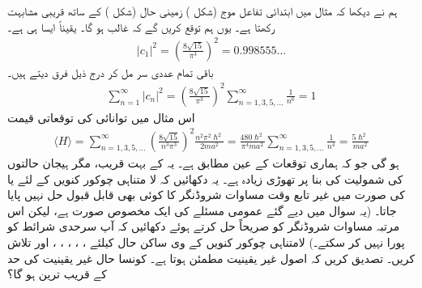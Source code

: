 ہم نے دیکھا کہ مثال  میں ابتدائی تفاعل موج (شکل ) زمینی حال  (شکل ) کے ساتھ قریبی مشابہت رکھتا ہے۔ یوں ہم توقع کریں گے کہ  غالب ہو گا۔ یقیناً ایسا ہی ہے۔
\begin{align*}
\left| c_{1} \right|^{2} = \left( \frac{8\sqrt{15}}{\pi^{3}} \right)^{2} = 0.998555 \dotso
\end{align*}
باقی تمام عددی سر مل کر درج ذیل فرق دیتے ہیں۔
\begin{align*}
\sum_{n=1}^{\infty} \left| c_{n} \right|^{2} = \left( \frac{8\sqrt{15}}{\pi^{3}} \right)^{2} \sum_{n=1,3,5,...}^{\infty} \frac{1}{n^{6}} = 1
\end{align*}
اس مثال میں توانائی کی توقعاتی قیمت
\begin{align*}
\langle H \rangle = \sum_{n=1,3,5,...}^{\infty} \left( \frac{8\sqrt{15}}{n^{3} \pi^{3}} \right)^{2} \frac{n^{2} \pi^{2} \hslash^{2}}{2ma^{2}} = \frac{480\hslash^{2}}{\pi^{4} ma^{2}} \sum_{n=1,3,5,...}^{\infty} \frac{1}{n^{4}} = \frac{5 \hslash^{2}}{ma^{2}}
\end{align*}
 ہو گی جو کہ ہماری توقعات کے عین مطابق ہے۔ یہ  کے بہت قریب، مگر ہیجان حالتوں کی شمولیت کی بنا پر تھوڑی زیادہ ہے۔ 
یہ دکھائیں کہ لا متناہی چوکور کنویں کے لئے  یا  کی صورت میں غیر تابع وقت مساوات شروڈنگر کا کوئی بھی قابل قبول حل نہیں پایا جاتا۔ (یہ سوال  میں دیے گئے عمومی مسئلے کی ایک مخصوص صورت ہے، لیکن اس مرتبہ مساوات شروڈنگر کو صریحاً حل کرتے ہوئے دکھائیں کہ آپ سرحدی شرائط کو پورا نہیں کر سکتے۔)
لامتناہی چوکور کنویں کے  وی ساکن حال کیلئے ، ، ، ، ، اور  تلاش کریں۔ تصدیق کریں کہ اصول غیر یقینیت مطمئن ہوتا ہے۔ کونسا حال غیر یقینیت کی حد کے قریب ترین ہو گا؟
